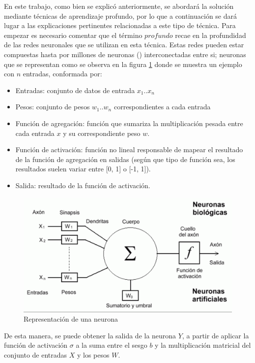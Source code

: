  En este trabajo, como bien se explicó anteriormente, se abordará la solución mediante técnicas de aprendizaje profundo, por lo que a continuación se dará lugar a las explicaciones pertinentes relacionadas a este tipo de técnica.
 Para empezar es necesario comentar que el término \(profundo\) recae en la profundidad de las redes neuronales que se utilizan en esta técnica. Estas redes pueden estar compuestas hasta por millones de neuronas (\cite{mcculloch1943logical}) interconectadas entre si; neuronas que se representan como se observa en la figura \ref{fig:representacion_neurona} donde se muestra un ejemplo con \(n\) entradas, conformada por: 
 \begin{itemize}
 	\item Entradas: conjunto de datos de entrada \(x_1\)..\(x_n\)
 	\item Pesos: conjunto de pesos \(w_1\)..\(w_n\) correspondientes a cada entrada
 	\item Función de agregación: función que sumariza la multiplicación pesada entre cada entrada \(x\) y su correspondiente peso \(w\).
	\item Función de activación: función no lineal responsable de mapear el resultado de la función de agregación en salidas (según que tipo de función sea, los resultados suelen variar entre [0, 1] o [-1, 1]).
	\item Salida: resultado de la función de activación.
 \end{itemize}
 
 
\begin{figure}[!h]
\centering
\includegraphics[width=.8\linewidth]{images/representacion_neurona}
\caption[Representación de una neurona]{Representación de una neurona \cite{russell2016artificial}}
\label{fig:representacion_neurona}
\end{figure}

De esta manera, se puede obtener la salida de la neurona \(Y\), a partir de aplicar la función de activación \(\sigma\) a la suma entre el sesgo \(b\) y la multiplicación matricial del conjunto de entradas \(X\) y los pesos \(W\).

